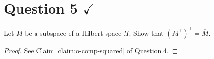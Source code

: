 \section{Question 5 \texorpdfstring{$\checkmark$}{}}

\horz

Let $M$ be a subspace of a Hilbert space $H$. Show that $(M^{\perp})^{\perp}= \overline{M}.$

\horz
\begin{proof}
    See Claim \ref{claim:o-comp-squared} of Question 4.
\end{proof}
